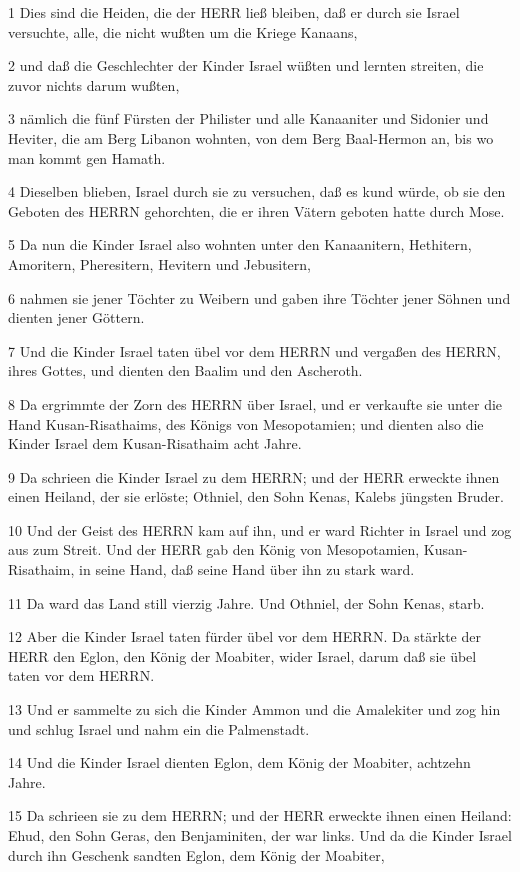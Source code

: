 \par 1 Dies sind die Heiden, die der HERR ließ bleiben, daß er durch sie Israel versuchte, alle, die nicht wußten um die Kriege Kanaans,
\par 2 und daß die Geschlechter der Kinder Israel wüßten und lernten streiten, die zuvor nichts darum wußten,
\par 3 nämlich die fünf Fürsten der Philister und alle Kanaaniter und Sidonier und Heviter, die am Berg Libanon wohnten, von dem Berg Baal-Hermon an, bis wo man kommt gen Hamath.
\par 4 Dieselben blieben, Israel durch sie zu versuchen, daß es kund würde, ob sie den Geboten des HERRN gehorchten, die er ihren Vätern geboten hatte durch Mose.
\par 5 Da nun die Kinder Israel also wohnten unter den Kanaanitern, Hethitern, Amoritern, Pheresitern, Hevitern und Jebusitern,
\par 6 nahmen sie jener Töchter zu Weibern und gaben ihre Töchter jener Söhnen und dienten jener Göttern.
\par 7 Und die Kinder Israel taten übel vor dem HERRN und vergaßen des HERRN, ihres Gottes, und dienten den Baalim und den Ascheroth.
\par 8 Da ergrimmte der Zorn des HERRN über Israel, und er verkaufte sie unter die Hand Kusan-Risathaims, des Königs von Mesopotamien; und dienten also die Kinder Israel dem Kusan-Risathaim acht Jahre.
\par 9 Da schrieen die Kinder Israel zu dem HERRN; und der HERR erweckte ihnen einen Heiland, der sie erlöste; Othniel, den Sohn Kenas, Kalebs jüngsten Bruder.
\par 10 Und der Geist des HERRN kam auf ihn, und er ward Richter in Israel und zog aus zum Streit. Und der HERR gab den König von Mesopotamien, Kusan-Risathaim, in seine Hand, daß seine Hand über ihn zu stark ward.
\par 11 Da ward das Land still vierzig Jahre. Und Othniel, der Sohn Kenas, starb.
\par 12 Aber die Kinder Israel taten fürder übel vor dem HERRN. Da stärkte der HERR den Eglon, den König der Moabiter, wider Israel, darum daß sie übel taten vor dem HERRN.
\par 13 Und er sammelte zu sich die Kinder Ammon und die Amalekiter und zog hin und schlug Israel und nahm ein die Palmenstadt.
\par 14 Und die Kinder Israel dienten Eglon, dem König der Moabiter, achtzehn Jahre.
\par 15 Da schrieen sie zu dem HERRN; und der HERR erweckte ihnen einen Heiland: Ehud, den Sohn Geras, den Benjaminiten, der war links. Und da die Kinder Israel durch ihn Geschenk sandten Eglon, dem König der Moabiter,
